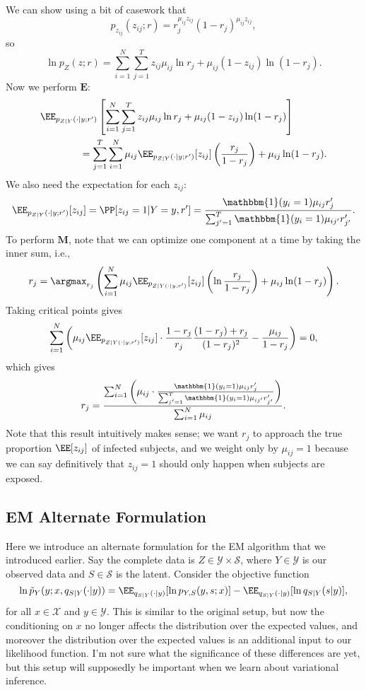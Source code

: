 \noindent We can show using a bit of casework that 
\[p_{z_{ij}}(z_{ij};r) = r_j^{\mu_{ij}z_{ij}}(1-r_j)^{\mu_{ij}z_{ij}},\] 
so 
\[\ln p_Z(z;r) = \sum_{i=1}^N\sum_{j=1}^T z_{ij}\mu_{ij}\ln r_j + \mu_{ij}(1-z_{ij})\ln (1-r_j).\] 
Now we perform $\mathbf{E}$: 
\begin{align*}
	&\EE_{p_{Z|Y}(\cdot | y;r')}\left[\sum_{i=1}^N\sum_{j=1}^Tz_{ij}\mu_{ij}\ln r_j + \mu_{ij}(1-z_{ij})\ln (1-r_j)\right] \\
	&\qquad\qquad= \sum_{j=1}^T\sum_{i=1}^N \mu_{ij}\EE_{p_{Z|Y}(\cdot | y;r')}[z_{ij}]\left(\frac{r_j}{1-r_j}\right) + \mu_{ij}\ln (1-r_j).
\end{align*}
We also need the expectation for each $z_{ij}$: 
\begin{align*}
	\EE_{p_{Z|Y}(\cdot | y;r')}[z_{ij}] = \PP[z_{ij}=1|Y=y,r'] = \frac{\mathbbm{1}(y_i=1)\mu_{ij}r_j'}{\sum_{j'=1}^T\mathbbm{1}(y_i=1)\mu_{ij'}r_{j'}'}.
\end{align*}
To perform $\mathbf{M}$, note that we can optimize one component at a time by taking the inner sum, i.e., 
\[r_j = \argmax_{r_j}\left(\sum_{i=1}^N\mu_{ij}\EE_{p_{Z|Y(\cdot | y;r')}}[z_{ij}]\left(\ln \frac{r_j}{1-r_j}\right) + \mu_{ij}\ln (1-r_j)\right).\] 
Taking critical points gives
\[\sum_{i=1}^N\left(\mu_{ij}\EE_{p_{Z|Y(\cdot | y;r')}}[z_{ij}]\cdot \frac{1-r_j}{r_j}\frac{(1-r_j) + r_j}{(1-r_j)^2} - \frac{\mu_{ij}}{1-r_j}\right) = 0,\] 
which gives
\[r_j = \frac{\sum_{i=1}^N\left(\mu_{ij}\cdot \frac{\mathbbm{1}(y_i=1)\mu_{ij}r_j'}{\sum_{j'=1}^T\mathbbm{1}(y_i=1)\mu_{ij'}r_{j'}'}\right)}{\sum_{i=1}^N\mu_{ij}}.\] 
Note that this result intuitively makes sense; we want $r_j$ to approach the true proportion $\EE[z_{ij}]$ of infected subjects, and we weight only by $\mu_{ij}=1$ because we can say definitively that $z_{ij}=1$ should only happen when subjects are exposed.

\subsection{EM Alternate Formulation}

Here we introduce an alternate formulation for the EM algorithm that we introduced earlier. Say the complete data is $Z\in \mathcal{Y}\times \mathcal{S}$, where $Y\in \mathcal{Y}$ is our observed data and $S\in \mathcal{S}$ is the latent. Consider the objective function 
\[\ln \tilde{p}_{Y}(y;x,q_{S|Y}(\cdot|y)) = \EE_{q_{S|Y}(\cdot | y)}[\ln p_{Y,S}(y,s;x)] - \EE_{q_{S|Y}(\cdot | y)}[\ln q_{S|Y}(s|y)],\] 
for all $x\in \mathcal{X}$ and $y\in \mathcal{Y}$. This is similar to the original setup, but now the conditioning on $x$ no longer affects the distribution over the expected values, and moreover the distribution over the expected values is an additional input to our likelihood function. I'm not sure what the significance of these differences are yet, but this setup will supposedly be important when we learn about variational inference. 

